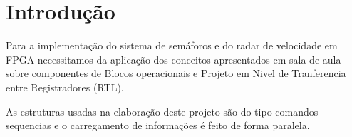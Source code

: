 \section{Introdução}
\setlength{\parindent}{2cm}

Para a implementação do sistema de semáforos e do radar de velocidade em FPGA necessitamos da aplicação dos conceitos apresentados em sala de aula sobre componentes de Blocos operacionais e Projeto em Nivel de Tranferencia entre Registradores (RTL).

As estruturas usadas na elaboração deste projeto são do tipo comandos sequencias e o carregamento de informações é feito de forma paralela.